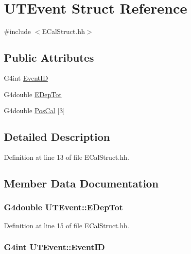 \hypertarget{struct_u_t_event}{\section{U\-T\-Event Struct Reference}
\label{struct_u_t_event}
}


{\ttfamily \#include $<$E\-Cal\-Struct.\-hh$>$}

\subsection*{Public Attributes}
\begin{DoxyCompactItemize}
\item 
G4int \hyperlink{struct_u_t_event_a91299ec93d53b82dabce2d4c42894728}{Event\-I\-D}
\item 
G4double \hyperlink{struct_u_t_event_afd45919a2a7eb8800e185193d5de7cd7}{E\-Dep\-Tot}
\item 
G4double \hyperlink{struct_u_t_event_ac7679fd27bb05442592f26f0039bb6ea}{Pos\-Cal} \mbox{[}3\mbox{]}
\end{DoxyCompactItemize}


\subsection{Detailed Description}


Definition at line 13 of file E\-Cal\-Struct.\-hh.



\subsection{Member Data Documentation}
\hypertarget{struct_u_t_event_afd45919a2a7eb8800e185193d5de7cd7}{
\subsubsection[{E\-Dep\-Tot}]{\setlength{\rightskip}{0pt plus 5cm}G4double U\-T\-Event\-::\-E\-Dep\-Tot}}\label{struct_u_t_event_afd45919a2a7eb8800e185193d5de7cd7}


Definition at line 15 of file E\-Cal\-Struct.\-hh.

\hypertarget{struct_u_t_event_a91299ec93d53b82dabce2d4c42894728}{
\subsubsection[{Event\-I\-D}]{\setlength{\rightskip}{0pt plus 5cm}G4int U\-T\-Event\-::\-Event\-I\-D}}\label{struct_u_t_event_a91299ec93d53b82dabce2d4c42894728}


